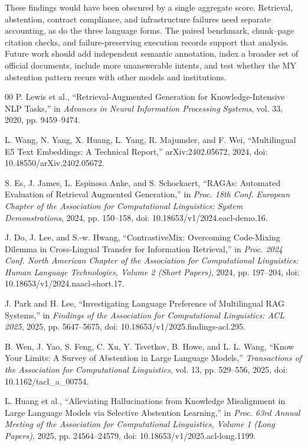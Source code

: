 \documentclass[a4paper,conference]{IEEEtran}
\begin{document}
These findings would have been obscured by a single aggregate score. Retrieval, abstention, contract compliance, and infrastructure failures need separate accounting, as do the three language forms. The paired benchmark, chunk--page citation checks, and failure-preserving execution records support that analysis. Future work should add independent semantic annotation, index a broader set of official documents, include more unanswerable intents, and test whether the MY abstention pattern recurs with other models and institutions.

\balance
\begin{thebibliography}{00}
P. Lewis et al., ``Retrieval-Augmented Generation for Knowledge-Intensive NLP Tasks,'' in \emph{Advances in Neural Information Processing Systems}, vol. 33, 2020, pp. 9459--9474.

L. Wang, N. Yang, X. Huang, L. Yang, R. Majumder, and F. Wei, ``Multilingual E5 Text Embeddings: A Technical Report,'' arXiv:2402.05672, 2024, doi: 10.48550/arXiv.2402.05672.

S. Es, J. James, L. Espinosa Anke, and S. Schockaert, ``RAGAs: Automated Evaluation of Retrieval Augmented Generation,'' in \emph{Proc. 18th Conf. European Chapter of the Association for Computational Linguistics: System Demonstrations}, 2024, pp. 150--158, doi: 10.18653/v1/2024.eacl-demo.16.

J. Do, J. Lee, and S.-w. Hwang, ``ContrastiveMix: Overcoming Code-Mixing Dilemma in Cross-Lingual Transfer for Information Retrieval,'' in \emph{Proc. 2024 Conf. North American Chapter of the Association for Computational Linguistics: Human Language Technologies, Volume 2 (Short Papers)}, 2024, pp. 197--204, doi: 10.18653/v1/2024.naacl-short.17.

J. Park and H. Lee, ``Investigating Language Preference of Multilingual RAG Systems,'' in \emph{Findings of the Association for Computational Linguistics: ACL 2025}, 2025, pp. 5647--5675, doi: 10.18653/v1/2025.findings-acl.295.

B. Wen, J. Yao, S. Feng, C. Xu, Y. Tsvetkov, B. Howe, and L. L. Wang, ``Know Your Limits: A Survey of Abstention in Large Language Models,'' \emph{Transactions of the Association for Computational Linguistics}, vol. 13, pp. 529--556, 2025, doi: 10.1162/tacl\_a\_00754.

L. Huang et al., ``Alleviating Hallucinations from Knowledge Misalignment in Large Language Models via Selective Abstention Learning,'' in \emph{Proc. 63rd Annual Meeting of the Association for Computational Linguistics, Volume 1 (Long Papers)}, 2025, pp. 24564--24579, doi: 10.18653/v1/2025.acl-long.1199.


\end{thebibliography}
\end{document}
